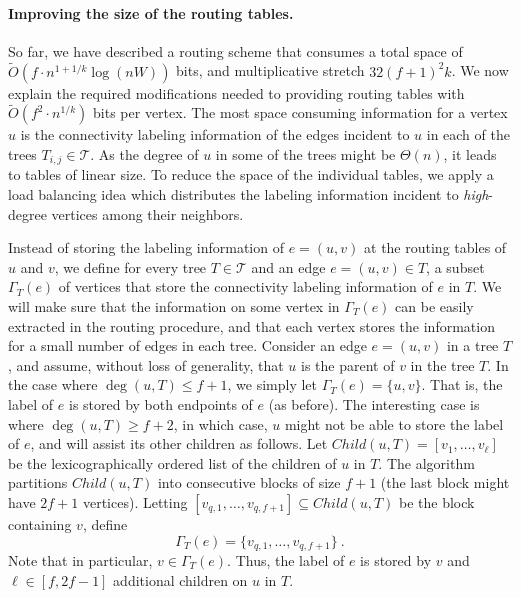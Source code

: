 
\paragraph{Improving the size of the routing tables.} 
So far, we have described a routing scheme that consumes a total space of $\widetilde{O}(f\cdot n^{1+1/k}\log (nW))$ bits, and multiplicative stretch %
$32(f+1)^2 k$. We now explain the required modifications needed to providing routing tables with $\widetilde{O}(f^2\cdot n^{1/k})$ bits per vertex. The most space consuming information for a vertex $u$ is the connectivity labeling
information of the edges incident to $u$ in each of the trees $T_{i,j} \in \mathcal{T}$. As the degree of $u$ in some of the trees might be $\Theta(n)$, it leads to tables of linear size. To reduce the space of the individual tables, we apply a load balancing idea which distributes the labeling information incident to \emph{high}-degree vertices among their neighbors. 

Instead of storing the labeling information of $e=(u,v)$ at the routing tables of $u$ and $v$, we define 
for every tree $T \in \mathcal{T}$ and an edge $e=(u,v) \in T$, a subset $\Gamma_T(e)$ of vertices that store the connectivity labeling information of $e$ in $T$. We will make sure that the information on some vertex in $\Gamma_T(e)$ can be easily extracted in the routing procedure, and that each vertex stores the information for a small number of edges in each tree. Consider an edge $e=(u,v)$ in a tree $T$, and assume, without loss of generality, that $u$ is the parent of $v$ in the tree $T$. In the case where $\deg(u,T)\leq f+1$, we simply let $\Gamma_T(e)=\{u,v\}$. That is, the label of $e$ is stored by both endpoints of $e$ (as before). The interesting case is where $\deg(u,T)\geq f+2$, in which case, $u$ might not be able to store the label of $e$, and will assist its other children as follows.  Let $Child(u,T)=[v_1,\ldots, v_\ell]$ be the lexicographically ordered list of the children of $u$ in $T$.  The algorithm partitions $Child(u,T)$ into consecutive blocks of size $f+1$ (the last block might have $2f+1$ vertices). Letting $[v_{q,1}, \ldots, v_{q,f+1}] \subseteq Child(u,T)$ be the block containing $v$, define
$$\Gamma_T(e)=\{v_{q,1}, \ldots, v_{q,f+1}\}~.$$
Note that in particular, $v \in \Gamma_T(e)$. Thus, the label of $e$ is stored by $v$ and $\ell \in [f,2f-1]$ additional children on $u$ in $T$. 


